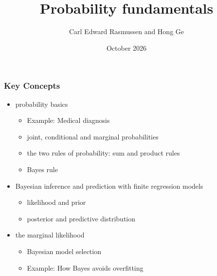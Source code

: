 

\title{Probability fundamentals}
\author{Carl Edward Rasmussen and Hong Ge}
\date{October 2026}



\begin{frame}
\titlepage
\end{frame}

\begin{frame}
\frametitle{Key Concepts}

\begin{itemize}
\item probability basics
\begin{itemize}
\item Example: Medical diagnosis
\item joint, conditional and marginal probabilities
\item the two rules of probability: sum and product rules
\item Bayes rule
\end{itemize}
\item Bayesian inference and prediction with finite regression models
\begin{itemize}
\item likelihood and prior
\item posterior and predictive distribution
\end{itemize}
\item the marginal likelihood
\begin{itemize}
\item Bayesian model selection
\item Example: How Bayes avoids overfitting
\end{itemize}
\end{itemize}
\end{frame}


